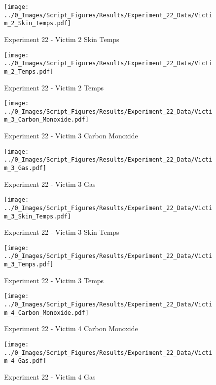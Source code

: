 	\begin{figure}[H]
		\centering
		\texttt{[image: ../0\_Images/Script\_Figures/Results/Experiment\_22\_Data/Victim\_2\_Skin\_Temps.pdf]}
		\caption[]{Experiment 22 - Victim 2 Skin Temps}
	\end{figure}
 
	\clearpage

	\begin{figure}[H]
		\centering
		\texttt{[image: ../0\_Images/Script\_Figures/Results/Experiment\_22\_Data/Victim\_2\_Temps.pdf]}
		\caption[]{Experiment 22 - Victim 2 Temps}
	\end{figure}
 

	\begin{figure}[H]
		\centering
		\texttt{[image: ../0\_Images/Script\_Figures/Results/Experiment\_22\_Data/Victim\_3\_Carbon\_Monoxide.pdf]}
		\caption[]{Experiment 22 - Victim 3 Carbon Monoxide}
	\end{figure}
 
	\clearpage

	\begin{figure}[H]
		\centering
		\texttt{[image: ../0\_Images/Script\_Figures/Results/Experiment\_22\_Data/Victim\_3\_Gas.pdf]}
		\caption[]{Experiment 22 - Victim 3 Gas}
	\end{figure}
 

	\begin{figure}[H]
		\centering
		\texttt{[image: ../0\_Images/Script\_Figures/Results/Experiment\_22\_Data/Victim\_3\_Skin\_Temps.pdf]}
		\caption[]{Experiment 22 - Victim 3 Skin Temps}
	\end{figure}
 
	\clearpage

	\begin{figure}[H]
		\centering
		\texttt{[image: ../0\_Images/Script\_Figures/Results/Experiment\_22\_Data/Victim\_3\_Temps.pdf]}
		\caption[]{Experiment 22 - Victim 3 Temps}
	\end{figure}
 

	\begin{figure}[H]
		\centering
		\texttt{[image: ../0\_Images/Script\_Figures/Results/Experiment\_22\_Data/Victim\_4\_Carbon\_Monoxide.pdf]}
		\caption[]{Experiment 22 - Victim 4 Carbon Monoxide}
	\end{figure}
 
	\clearpage

	\begin{figure}[H]
		\centering
		\texttt{[image: ../0\_Images/Script\_Figures/Results/Experiment\_22\_Data/Victim\_4\_Gas.pdf]}
		\caption[]{Experiment 22 - Victim 4 Gas}
	\end{figure}
 

